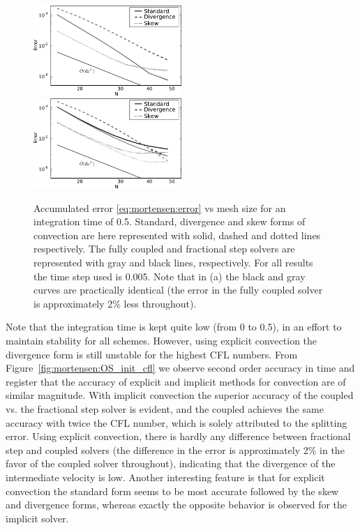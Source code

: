 \begin{figure}
 \includegraphics[width=0.5\textwidth]{chapters/mortensen/pdf/OS_init_dx_1.pdf}
 \includegraphics[width=0.5\textwidth]{chapters/mortensen/pdf/OS_init_dx_0.pdf}
%
 \caption{Accumulated error \eqref{eq:mortensen:error} vs mesh size
   for an integration time of 0.5. Standard, divergence and skew forms
   of convection are here represented with solid, dashed and dotted
   lines respectively. The fully coupled and fractional step solvers
   are represented with gray and black lines, respectively. For all
   results the time step used is 0.005. Note that in (a) the black and
   gray curves are practically identical (the error in the fully
   coupled solver is approximately 2\% less throughout). }
\label{fig:mortensen:OS_init_dx}
\end{figure}
Note that the integration time is kept quite low (from 0 to 0.5), in an
effort to maintain stability for all schemes. However, using explicit
convection the divergence form is still unstable for the highest CFL
numbers. From Figure~\ref{fig:mortensen:OS_init_cfl} we observe second
order accuracy in time and register that the accuracy of explicit and
implicit methods for convection are of similar magnitude. With implicit
convection the superior accuracy of the coupled vs. the fractional step
solver is evident, and the coupled achieves the same accuracy with twice
the CFL number, which is solely attributed to the splitting error. Using
explicit convection, there is hardly any difference between fractional
step and coupled solvers (the difference in the error is approximately
2\% in the favor of the coupled solver throughout), indicating that
the divergence of the intermediate velocity is low. Another interesting
feature is that for explicit convection the standard form seems to be
most accurate followed by the skew and divergence forms, whereas exactly
the opposite behavior is observed for the implicit solver.

